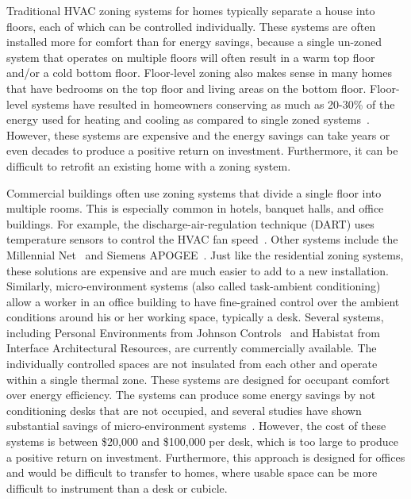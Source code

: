 
Traditional HVAC zoning systems for homes typically separate a house into
floors, each of which can be controlled individually.  These systems are often
installed more for comfort than for energy savings, because a single un-zoned
system that operates on multiple floors will often result in a warm top floor
and/or a cold bottom floor.  Floor-level zoning also makes sense in many homes
that have bedrooms on the top floor and living areas on the bottom floor.
Floor-level systems have resulted in homeowners conserving as much as 20-30\% of
the energy used for heating and cooling as compared to single zoned
systems~\cite{Systems2003}. However, these systems are expensive and the energy
savings can take years or even decades to produce a positive return on
investment.  Furthermore, it can be difficult to retrofit an existing home with
a zoning system.


Commercial buildings often use zoning systems that divide a single floor into
multiple rooms.  This is especially common in hotels, banquet halls, and office
buildings.  For example, the discharge-air-regulation technique (DART) uses
temperature sensors to control the HVAC fan
speed~\cite{federspiel2006wireless}. Other systems include the Millennial
Net~\cite{Net2009} and Siemens APOGEE~\cite{Inc.2010}.  Just like the
residential zoning systems, these solutions are expensive and are much easier to
add to a new installation.  Similarly, micro-environment systems (also called
task-ambient conditioning) allow a worker in an office building to have
fine-grained control over the ambient conditions around his or her working
space, typically a desk. Several systems, including Personal Environments from
Johnson Controls~\cite{Controls2010} and Habistat from Interface Architectural
Resources, are currently commercially available. The individually controlled
spaces are not insulated from each other and operate within a single thermal
zone. These systems are designed for occupant comfort over energy efficiency.
The systems can produce some energy savings by not conditioning desks that are
not occupied, and several studies have shown substantial savings of
micro-environment systems~\cite{Airgonomix2008,rose1997epa,llc2002energy}.
However, the cost of these systems is between \$20,000 and \$100,000 per desk,
which is too large to produce a positive return on investment.  Furthermore,
this approach is designed for offices and would be difficult to transfer to
homes, where usable space can be more difficult to instrument than a desk or
cubicle.

